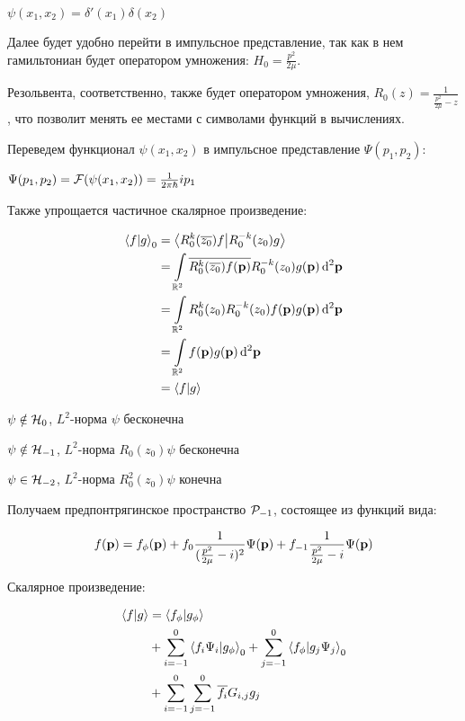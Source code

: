 
$\psi(x_1, x_2) = \delta'(x_1) \delta(x_2)$

Далее будет удобно перейти в импульсное представление, так как в нем гамильтониан будет оператором умножения: $H_0 = \frac{p^2}{2 \mu}$.

Резольвента, соответственно, также будет оператором умножения, $R_0(z) = \frac{1}{\frac{p^2}{2 \mu} - z}$, что позволит менять ее местами с символами функций в вычислениях.

Переведем функционал $\psi(x_1, x_2)$ в импульсное представление $\Psi(p_1, p_2)$:

$\Psi(p_1, p_2) = \mathcal{F}(\psi(x_1, x_2)) = \frac{1}{2 \pi \hbar} i p_1$

Также упрощается частичное скалярное произведение:

\begin{align*}
\ip{f}{g}_0
&= \ip{R_0^k(\cconj{z_0}) f}{R_0^{-k}(z_0) g} \\
&= \int\limits_{\bbR^2} \cconj{R_0^k(\cconj{z_0}) f(\vb{p})} R_0^{-k}(z_0) g(\vb{p}) \dd[2]{\vb{p}} \\
&= \int\limits_{\bbR^2} R_0^k(z_0) R_0^{-k}(z_0) f(\vb{p}) g(\vb{p}) \dd[2]{\vb{p}} \\
&= \int\limits_{\bbR^2} f(\vb{p}) g(\vb{p}) \dd[2]{\vb{p}} \\
&= \ip{f}{g}
\end{align*}

$\psi \notin \mathcal{H}_{0}$, $L^2$-норма $\psi$ бесконечна

$\psi \notin \mathcal{H}_{-1}$, $L^2$-норма $R_0(z_0) \psi$ бесконечна

$\psi \in \mathcal{H}_{-2}$, $L^2$-норма $R_0^2(z_0) \psi$ конечна

Получаем предпонтрягинское пространство $\mathcal{P}_{-1}$, состоящее из функций вида:

\[
f(\vb{p}) = f_\phi(\vb{p}) + f_0 \frac{1}{(\frac{p^2}{2 \mu} - i)^2} \Psi(\vb{p}) + f_{-1} \frac{1}{\frac{p^2}{2 \mu} - i} \Psi(\vb{p})
\]

Скалярное произведение:

\begin{align*}
\ip{f}{g}
&= \ip{f_\phi}{g_\phi} \\
&+ \sum\limits_{i = -1}^0 \ip{f_i \Psi_i}{g_\phi}_0 + \sum\limits_{j = -1}^0 \ip{f_\phi}{g_j \Psi_j}_0 \\
&+ \sum\limits_{i = -1}^0 \sum \limits_{j = -1}^0 \cconj{f_i} G_{i,j} g_j 
\end{align*}


